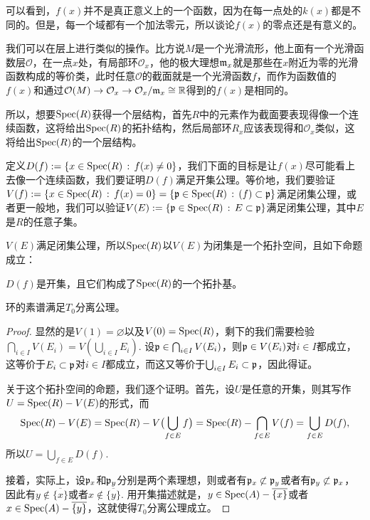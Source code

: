 可以看到，$f(x)$并不是真正意义上的一个函数，因为在每一点处的$k(x)$都是不同的。但是，每一个域都有一个加法零元，所以谈论$f(x)$的零点还是有意义的。

我们可以在层上进行类似的操作。比方说$M$是一个光滑流形，他上面有一个光滑函数层$\mathcal{O}$，在一点$x$处，有局部环$\mathcal{O}_x$，他的极大理想$\mathfrak{m}_x$就是那些在$x$附近为零的光滑函数构成的等价类，此时任意$\mathcal{O}$的截面就是一个光滑函数$f$，而作为函数值的$f(x)$和通过$\mathcal{O}(M)\to \mathcal{O}_x\to \mathcal{O}_x/\mathfrak{m}_x\cong \mathbb{R}$得到的$f(x)$是相同的。

所以，想要$\operatorname{Spec}(R)$获得一个层结构，首先$R$中的元素作为截面要表现得像一个连续函数，这将给出$\operatorname{Spec}(R)$的拓扑结构，然后局部环$R_x$应该表现得和$\mathcal{O}_x$类似，这将给出$\operatorname{Spec}(R)$的一个层结构。

\begin{para}[素谱的拓扑结构]
定义$D(f):=\{x\in \operatorname{Spec}(R)\,:\, f(x)\neq 0\}$，我们下面的目标是让$f(x)$尽可能看上去像一个连续函数，我们要证明$D(f)$满足开集公理。等价地，我们要验证$V(f):=\{x\in \operatorname{Spec}(R)\,:\, f(x)=0\}=\{\mathfrak{p}\in \operatorname{Spec}(R)\,:\, (f)\subset \mathfrak{p}\}$满足闭集公理，或者更一般地，我们可以验证$V(E):=\{\mathfrak{p}\in \operatorname{Spec}(R)\,:\, E\subset \mathfrak{p}\}$满足闭集公理，其中$E$是$R$的任意子集。
\end{para}

\begin{pro}\label{pro:3.4}
$V(E)$满足闭集公理，所以$\operatorname{Spec}(R)$以$V(E)$为闭集是一个拓扑空间，且如下命题成立：
\begin{compactenum}
\item $D(f)$是开集，且它们构成了$\operatorname{Spec}(R)$的一个拓扑基。
\item 环的素谱满足$T_0$分离公理。
\end{compactenum}
\end{pro}

\begin{proof}
显然的是$V(1)=\varnothing$以及$V(0)=\operatorname{Spec}(R)$，剩下的我们需要检验$\bigcap_{i\in I}V(E_i)=V(\bigcup_{i\in I}E_i)$. 设$\mathfrak{p} \in \bigcap_{i\in I}V(E_i)$，则$\mathfrak{p}\in V(E_i)$对$i\in I$都成立，这等价于$E_i\subset \mathfrak{p}$对$i\in I$都成立，而这又等价于$\bigcup_{i\in I}E_i \subset \mathfrak{p}$，因此得证。

关于这个拓扑空间的命题，我们逐个证明。首先，设$U$是任意的开集，则其写作$U=\operatorname{Spec}(R)-V(E)$的形式，而
\[
\operatorname{Spec}(R)-V(E)=\operatorname{Spec}(R)-V\bigl(\bigcup_{f\in E} f\bigr)=\operatorname{Spec}(R)-\bigcap_{f\in E}V(f)=\bigcup_{f\in E}D(f),
\]
所以$U=\bigcup_{f\in E}D(f)$.

接着，实际上，设$\mathfrak{p}_x$和$\mathfrak{p}_y$分别是两个素理想，则或者有$\mathfrak{p}_x\not\subset \mathfrak{p}_y$或者有$\mathfrak{p}_y\not\subset \mathfrak{p}_x$，因此有$y\not\in \overline{\{x\}}$或者$x\not\in \overline{\{y\}}$. 用开集描述就是，$y\in \operatorname{Spec}(A)-\overline{\{x\}}$或者$x\in \operatorname{Spec}(A)-\overline{\{y\}}$，这就使得$T_0$分离公理成立。
\end{proof}

